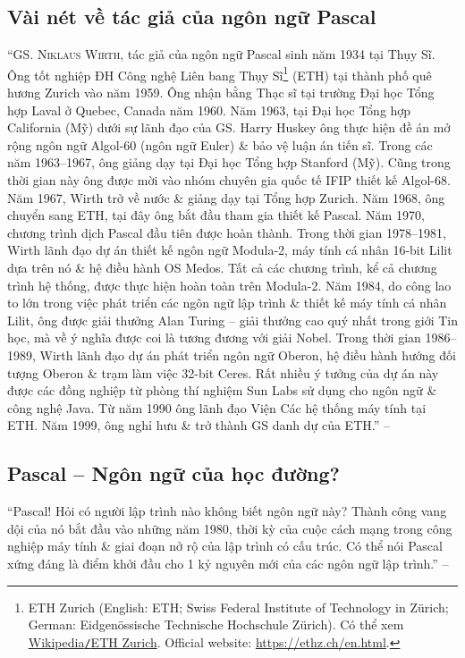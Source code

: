 \documentclass[oneside]{book}
\numberwithin{equation}{section}
\begin{document}
\subsection{Vài nét về tác giả của ngôn ngữ Pascal}
``GS. \textsc{Niklaus Wirth}, tác giả của ngôn ngữ Pascal sinh năm 1934 tại Thụy Sĩ. Ông tốt nghiệp ĐH Công nghệ Liên bang Thụy Sĩ\footnote{ETH Zurich (English: ETH; Swiss Federal Institute of Technology in Z\"urich; German: Eidgen\"ossische Technische Hochschule Z\"urich). Có thể xem \href{https://en.wikipedia.org/wiki/ETH_Zurich}{Wikipedia\texttt{/}ETH Zurich}. Official website: \url{https://ethz.ch/en.html}.} (ETH) tại thành phố quê hương Zurich vào năm 1959. Ông nhận bằng Thạc sĩ tại trường Đại học Tổng hợp Laval ở Quebec, Canada năm 1960. Năm 1963, tại Đại học Tổng hợp California (Mỹ) dưới sự lãnh đạo của GS. Harry Huskey ông thực hiện đề án mở rộng ngôn ngữ Algol-60 (ngôn ngữ Euler) \& bảo vệ luận án tiến sĩ. Trong các năm 1963--1967, ông giảng dạy tại Đại học Tổng hợp Stanford (Mỹ). Cũng trong thời gian này ông được mời vào nhóm chuyên gia quốc tế IFIP thiết kế Algol-68. Năm 1967, Wirth trở về nước \& giảng dạy tại Tổng hợp Zurich. Năm 1968, ông chuyển sang ETH, tại đây ông bắt đầu tham gia thiết kế Pascal. Năm 1970, chương trình dịch Pascal đầu tiên được hoàn thành. Trong thời gian 1978--1981, Wirth lãnh đạo dự án thiết kế ngôn ngữ Modula-2, máy tính cá nhân 16-bit Lilit dựa trên nó \& hệ điều hành OS Medos. Tất cả các chương trình, kể cả chương trình hệ thống, được thực hiện hoàn toàn trên Modula-2. Năm 1984, do công lao to lớn trong việc phát triển các ngôn ngữ lập trình \& thiết kế máy tính cá nhân Lilit, ông được giải thưởng Alan Turing -- giải thưởng cao quý nhất trong giới Tin học, mà về ý nghĩa được coi là tương đương với giải Nobel. Trong thời gian 1986--1989, Wirth lãnh đạo dự án phát triển ngôn ngữ Oberon, hệ điều hành hướng đối tượng Oberon \& trạm làm việc 32-bit Ceres. Rất nhiều ý tưởng của dự án này được các đồng nghiệp từ phòng thí nghiệm Sun Labs sử dụng cho ngôn ngữ \& công nghệ Java. Từ năm 1990 ông lãnh đạo Viện Các hệ thống máy tính tại ETH. Năm 1999, ông nghỉ hưu \& trở thành GS danh dự của ETH.'' -- \cite[p. 14]{SGK_Tin_Hoc_11}

\subsection{Pascal -- Ngôn ngữ của học đường?}
``Pascal! Hỏi có người lập trình nào không biết ngôn ngữ này? Thành công vang dội của nó bắt đầu vào những năm 1980, thời kỳ của cuộc cách mạng trong công nghiệp máy tính \& giai đoạn nở rộ của lập trình có cấu trúc. Có thể nói Pascal xứng đáng là điểm khởi đầu cho 1 kỷ nguyên mới của các ngôn ngữ lập trình.'' -- \cite[p. 15]{SGK_Tin_Hoc_11}
\end{document}

